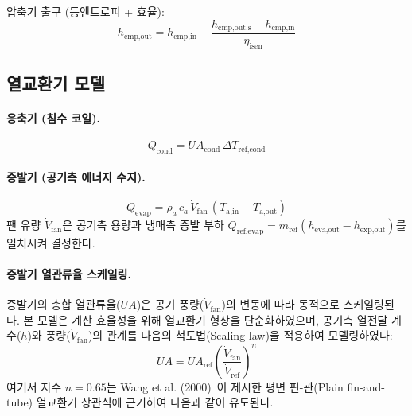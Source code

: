 압축기 출구 (등엔트로피 + 효율):
\begin{equation}\label{eq:ashp-cmp-out}
  h_\text{cmp,out} = h_\text{cmp,in} + \frac{h_\text{cmp,out,s} - h_\text{cmp,in}}{\eta_\text{isen}}
\end{equation}

\subsection{열교환기 모델}

\paragraph{응축기 (침수 코일).}
\begin{equation}\label{eq:ashp-Qcond}
  Q_\text{cond} = UA_\text{cond}\,\Delta T_\text{ref,cond}
\end{equation}

\paragraph{증발기 (공기측 에너지 수지).}
\begin{equation}\label{eq:ashp-Qevap}
  Q_\text{evap} = \rho_a\,c_a\,\dot{V}_\text{fan}\,(T_\text{a,in} - T_\text{a,out})
\end{equation}
팬 유량 $\dot{V}_\text{fan}$은 공기측 용량과 냉매측 증발 부하 $Q_\text{ref,evap} = \dot{m}_\text{ref}(h_\text{eva,out} - h_\text{exp,out})$를 일치시켜 결정한다.

\paragraph{증발기 열관류율 스케일링.}
증발기의 총합 열관류율($UA$)은 공기 풍량($\dot{V}_\text{fan}$)의 변동에 따라 동적으로 스케일링된다. 본 모델은 계산 효율성을 위해 열교환기 형상을 단순화하였으며, 공기측 열전달 계수($h$)와 풍량($\dot{V}_\text{fan}$)의 관계를 다음의 척도법(Scaling law)을 적용하여 모델링하였다:
\begin{equation}\label{eq:ashp-UA}
  UA = UA_\text{ref} \left( \frac{\dot{V}_\text{fan}}{\dot{V}_\text{ref}} \right)^n
\end{equation}
여기서 지수 $n=0.65$는 Wang et al. (2000)~\cite{wang2000heat}이 제시한 평면 핀-관(Plain fin-and-tube) 열교환기 상관식에 근거하여 다음과 같이 유도된다.

